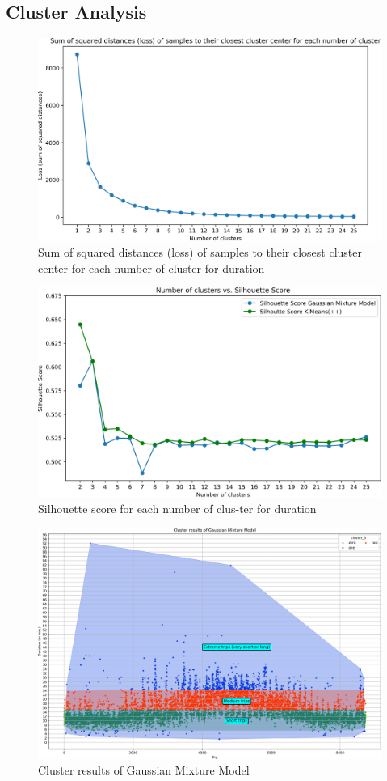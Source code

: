 \subsection{Cluster Analysis}
\label{app:A7}

\begin{figure}[H]
   \centering
    \includegraphics[width=0.8\linewidth]{./Figures/LossKMeans_Duration_dpi300.png}
    \caption{Sum of squared distances (loss) of samples to their closest cluster center for each number of cluster for duration}
    \label{LossKMeans_Duration_dpi300}
\end{figure}

\begin{figure}[H]
   \centering
    \includegraphics[width=0.8\linewidth]{./Figures/Silhouette_Duration.png}
    \caption{Silhouette score for each number of clus-ter for duration}
    \label{Silhouette_Duration}
\end{figure}

\begin{figure}[H]
   \centering
    \includegraphics[width=0.8\linewidth]{./Figures/FINAL_Cluster_Gaussian_Duration.png}
    \caption{Cluster results of Gaussian Mixture Model}
    \label{FINAL_Cluster_Gaussian_Duration}
\end{figure}

